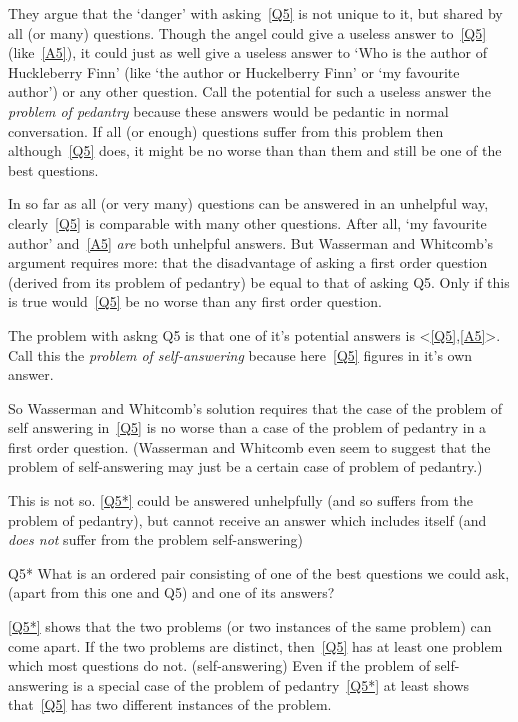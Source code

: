 They argue that the `danger' with asking~\ref{Q5} is not unique to it, but shared by all (or many) questions. 
Though the angel could give a useless answer to~\ref{Q5} (like~\ref{A5}), it could just as well give a useless answer to `Who is the author of Huckleberry Finn' (like `the author or Huckelberry Finn' or `my favourite author') or any other question.
Call the potential for such a useless answer the \textit{problem of pedantry} because these answers would be pedantic in normal conversation.
If all (or enough) questions suffer from this problem then although~\ref{Q5} does, it might be no worse than than them and still be one of the best questions.

In so far as all (or very many) questions can be answered in an unhelpful way, clearly~\ref{Q5} is comparable with many other questions.
After all, `my favourite author' and~\ref{A5} \emph{are} both unhelpful answers.
But Wasserman and Whitcomb's argument requires more: that the disadvantage of asking a first order question (derived from its problem of pedantry) be equal to that of asking Q5.
Only if this is true would~\ref{Q5} be no worse than any first order question.

The problem with askng Q5 is that one of it's potential answers is <\ref{Q5},\ref{A5}>.
Call this the \textit{problem of self-answering} because here~\ref{Q5} figures in it's own answer.

So Wasserman and Whitcomb's solution requires that the case of the problem of self answering in~\ref{Q5} is no worse than a case of the problem of pedantry in a first order question.
(Wasserman and Whitcomb even seem to suggest that the problem of self-answering may just be a certain case of problem of pedantry.)

This is not so.
\ref{Q5*} could be answered unhelpfully (and so suffers from the problem of pedantry), but cannot receive an answer which includes itself (and \emph{does not} suffer from the problem self-answering)

	\begin{principle}{Q5*}\label{Q5*}
	What is an ordered pair consisting of one of the best questions we could ask, (apart from this one and Q5) and one of its answers?
	\end{principle}

\ref{Q5*} shows that the two problems (or two instances of the same problem) can come apart.
If the two problems are distinct, then~\ref{Q5} has at least one problem which most questions do not. (self-answering)
Even if the problem of self-answering is a special case of the problem of pedantry~\ref{Q5*} at least shows that~\ref{Q5} has two different instances of the problem.

